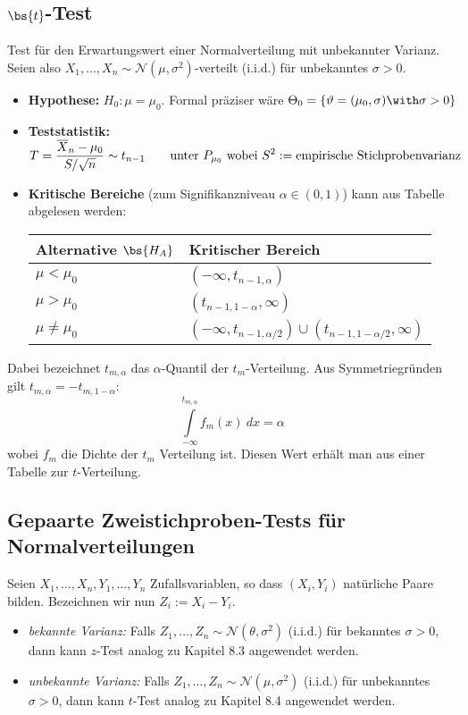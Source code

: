 \subsection{$\bs{t}$-Test}
Test für den Erwartungswert einer Normalverteilung mit unbekannter Varianz. Seien also $X_1,\dots,X_n \sim \mathcal{N}(\mu, \sigma^2)$-verteilt (i.i.d.) für unbekanntes $\sigma >0$.
\begin{itemize}
\item \textbf{Hypothese:} $H_0 : \mu = \mu_0$. Formal präziser wäre $\Theta_0 = \{\theta = (\mu_0, \sigma) \with \sigma > 0 \}$
\item \textbf{Teststatistik:} $\displaystyle T = \frac{\overline{X}_n - \mu_0}{S/\sqrt{n}} \sim
	t_{n-1} \quad \quad \mbox{unter } P_{\mu_0} \\ \mbox{ wobei } S^2 := \mbox{empirische Stichprobenvarianz}$
\item \textbf{Kritische Bereiche} (zum Signifikanzniveau $\alpha \in (0,1)$) kann aus Tabelle abgelesen werden:
\begin{table}[htp]
\centering
\label{t-test}
\begin{tabular}{@{}ll@{}}
\toprule
\textbf{Alternative} $\bs{H_A}$                                 & \textbf{Kritischer Bereich}                            \\ \midrule
$\mu < \mu_0$ & $ (-\infty, t_{n-1, \alpha})  $                               \\
$\mu > \mu_0 $                                       & $ (t_{n-1, 1-\alpha}, \infty)$                              \\
$\mu \neq \mu_0$                                     & $ (-\infty, t_{n-1, \alpha/2}) \cup (t_{n-1, 1-\alpha/2}, \infty)$ \\ \bottomrule
\end{tabular}
\end{table}
\end{itemize}
Dabei bezeichnet $t_{m,\alpha}$ das $\alpha$-Quantil der $t_m$-Verteilung. Aus Symmetriegründen gilt $t_{m,\alpha} = - t_{m,1-\alpha}$:
$$ \int \limits_{-\infty}^{t_{m,\alpha}} f_m(x) \ dx = \alpha $$
wobei $f_m$ die Dichte der $t_m$ Verteilung ist. Diesen Wert erhält man aus einer Tabelle zur $t$-Verteilung.

\subsection{Gepaarte Zweistichproben-Tests für Normalverteilungen}
Seien $X_1,\dots, X_n, Y_1, \dots, Y_n$ Zufallsvariablen, so dass $(X_i,Y_i)$ natürliche Paare bilden. Bezeichnen wir nun $Z_i := X_i - Y_i$.
\begin{itemize}
\item \textit{bekannte Varianz:} Falls $Z_1,\dots,Z_n \sim \mathcal{N}(\theta, \sigma^2)$ (i.i.d.) für bekanntes $\sigma >0$, dann kann $z$-Test analog zu Kapitel 8.3 angewendet werden.
\item \textit{unbekannte Varianz:} Falls $Z_1,\dots,Z_n \sim \mathcal{N}(\mu, \sigma^2)$ (i.i.d.) für unbekanntes $\sigma >0$, dann kann $t$-Test analog zu Kapitel 8.4 angewendet werden.
\end{itemize}

